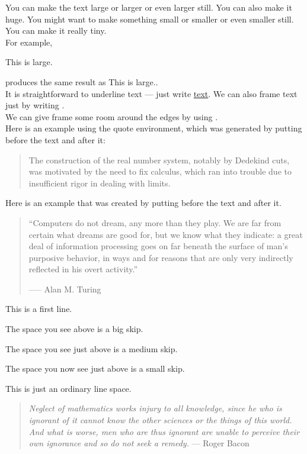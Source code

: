 \documentclass[12pt]{article}
\begin{document}
You can make the text {\large large} or {\Large larger} or
even {\LARGE larger still}. You can also make it {\huge huge}.
You might want to make something {\small small} or
{\footnotesize smaller} or even {\scriptsize smaller still}.
You can make it really {\tiny tiny}.\\
For example, \begin{large} This is large.\end{large}
produces the same result as {\large This is large.}.\\

It is straightforward to underline text — just write \underline{text}.
We can also frame text just by writing .\\

We can give frame some room around the edges by using .\\

Here is an example using the quote environment, which was generated by putting before the text and after it:
\begin{quote}
	The construction of the real number system, notably by Dedekind
	cuts, was motivated by the need to fix calculus, which ran into
	trouble due to insufficient rigor in dealing with limits.
\end{quote}

Here is an example that was created by putting before
the text and after it.
\begin{quotation} 
	\bigskip
	``Computers do not dream, any more than they play. We are
	far from certain what dreams are good for, but we know what
	they indicate: a great deal of information processing goes on far
	beneath the surface of man’s purposive behavior, in ways and
	for reasons that are only very indirectly reflected in his overt
	activity.''

	\hfill —-- Alan M. Turing
\end{quotation}

This is a first line. \bigskip

The space you see above is a big skip. \medskip

The space you see just above is a medium skip. \smallskip

The space you now see just above is a small skip.

This is just an ordinary line space.

\begin{verse}
	\textit{Neglect of mathematics works injury to all knowledge, since he
		who is ignorant of it cannot know the other sciences or the
		things of this world. And what is worse, men who are thus
		ignorant are unable to perceive their own ignorance and so do
		not seek a remedy.
	} \hfill --- Roger Bacon
\end{verse}
\end{document}
